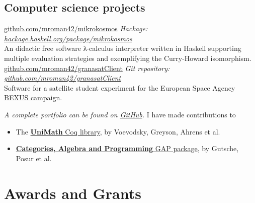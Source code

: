 \documentclass[nocolors]{friggeri-cv-a4}
\begin{document}


\subsection{Computer science projects}



\begin{entrylist}
{\href{https://github.com/mroman42/mikrokosmos}{github.com/mroman42/mikrokosmos}}
{\emph{Hackage: \href{https://hackage.haskell.org/package/mikrokosmos}{hackage.haskell.org/package/mikrokosmos}} \\
  An didactic free software λ-calculus interpreter written in Haskell supporting multiple evaluation strategies and exemplifying the Curry-Howard isomorphism.
}
{\href{https://github.com/mroman42/granasatClient}{github.com/mroman42/granasatClient}}
{\emph{Git repository: \href{https://github.com/mroman42/granasatClient}{github.com/mroman42/granasatClient}} \\
  Software for a satellite student experiment for the
  European Space Agency \href{http://rexusbexus.net/}{BEXUS campaign}.
}
\end{entrylist}

\textit{A complete portfolio can be found on
  \href{https://github.com/mroman42}{GitHub}.}
I have made contributions to
\begin{itemize}
\item The \href{https://github.com/UniMath/UniMath}{\textbf{UniMath} Coq library}, by Voevodsky, Greyson, Ahrens et al.
\item \href{https://homalg-project.github.io/CAP_project/CAP/}{\textbf{Categories, Algebra and Programming} GAP package},
  by Gutsche, Posur et al.
\end{itemize}

 
 
\section{Awards and Grants}
\end{document}
